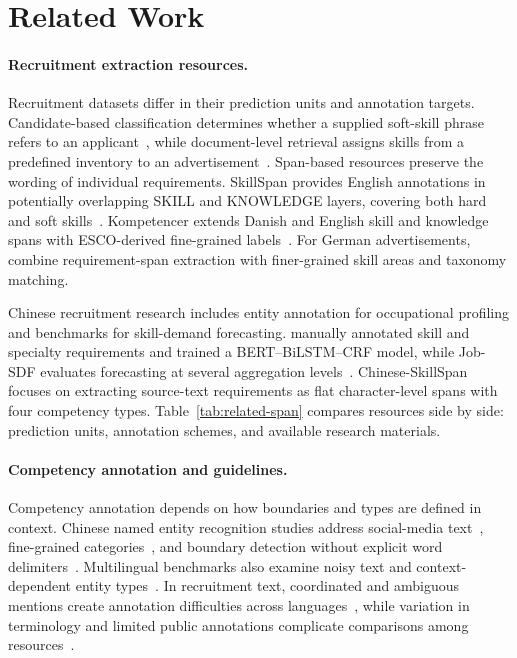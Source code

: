 \section{Related Work}
\label{sec:related}

\paragraph{Recruitment extraction resources.} Recruitment datasets differ in their prediction units and annotation targets. Candidate-based classification determines whether a supplied soft-skill phrase refers to an applicant~\citep{sayfullina2018softskills}, while document-level retrieval assigns skills from a predefined inventory to an advertisement~\citep{bhola2020retrieving}. Span-based resources preserve the wording of individual requirements. SkillSpan provides English annotations in potentially overlapping SKILL and KNOWLEDGE layers, covering both hard and soft skills~\citep{zhang2022skillspan}. Kompetencer extends Danish and English skill and knowledge spans with ESCO-derived fine-grained labels~\citep{jensen2022kompetencer}. For German advertisements, \citet{gnehm2022skills} combine requirement-span extraction with finer-grained skill areas and taxonomy matching.

Chinese recruitment research includes entity annotation for occupational profiling and benchmarks for skill-demand forecasting. \citet{cao2021occupational} manually annotated skill and specialty requirements and trained a BERT--BiLSTM--CRF model, while Job-SDF evaluates forecasting at several aggregation levels~\citep{chen2024jobsdf}. Chinese-SkillSpan focuses on extracting source-text requirements as flat character-level spans with four competency types. Table~\ref{tab:related-span} compares resources side by side: prediction units, annotation schemes, and available research materials.



\paragraph{Competency annotation and guidelines.} Competency annotation depends on how boundaries and types are defined in context. Chinese named entity recognition studies address social-media text~\citep{peng2015weibo}, fine-grained categories~\citep{cluener2020}, and boundary detection without explicit word delimiters~\citep{chen2021boundary}. Multilingual benchmarks also examine noisy text and context-dependent entity types~\citep{multiconer2023,dynamicner2025}. In recruitment text, coordinated and ambiguous mentions create annotation difficulties across languages~\citep{nguyen2024rethinking}, while variation in terminology and limited public annotations complicate comparisons among resources~\citep{senger2024survey}.

